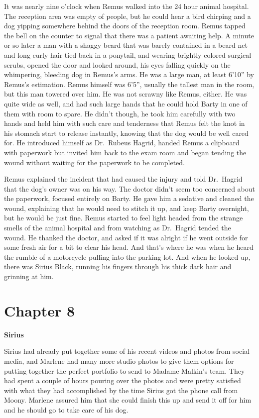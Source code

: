 \documentclass[12pt,twoside,openright]{memoir}
\begin{document}
It was nearly nine o'clock when Remus walked into the 24 hour animal hospital. The reception area was empty of people, but he could hear a bird chirping and a dog yipping somewhere behind the doors of the reception room. Remus tapped the bell on the counter to signal that there was a patient awaiting help. A minute or so later a man with a shaggy beard that was barely contained in a beard net and long curly hair tied back in a ponytail, and wearing brightly colored surgical scrubs, opened the door and looked around, his eyes falling quickly on the whimpering, bleeding dog in Remus's arms. He was a large man, at least 6'10'' by Remus's estimation. Remus himself was 6'5'', usually the tallest man in the room, but this man towered over him. He was not scrawny like Remus, either. He was quite wide as well, and had such large hands that he could hold Barty in one of them with room to spare. He didn't though, he took him carefully with two hands and held him with such care and tenderness that Remus felt the knot in his stomach start to release instantly, knowing that the dog would be well cared for. He introduced himself as Dr.\ Rubeus Hagrid, handed Remus a clipboard with paperwork but invited him back to the exam room and began tending the wound without waiting for the paperwork to be completed.

Remus explained the incident that had caused the injury and told Dr.\ Hagrid that the dog's owner was on his way. The doctor didn't seem too concerned about the paperwork, focused entirely on Barty. He gave him a sedative and cleaned the wound, explaining that he would need to stitch it up, and keep Barty overnight, but he would be just fine. Remus started to feel light headed from the strange smells of the animal hospital and from watching as Dr.\ Hagrid tended the wound. He thanked the doctor, and asked if it was alright if he went outside for some fresh air for a bit to clear his head. And that's where he was when he heard the rumble of a motorcycle pulling into the parking lot. And when he looked up, there was Sirius Black, running his fingers through his thick dark hair and grinning at him. 

\chapter{Chapter 8}

\textbf{Sirius} 

Sirius had already put together some of his recent videos and photos from social media, and Marlene had many more studio photos to give them options for putting together the perfect portfolio to send to Madame Malkin's team. They had spent a couple of hours pouring over the photos and were pretty satisfied with what they had accomplished by the time Sirius got the phone call from Moony. Marlene assured him that she could finish this up and send it off for him and he should go to take care of his dog.
\end{document}
